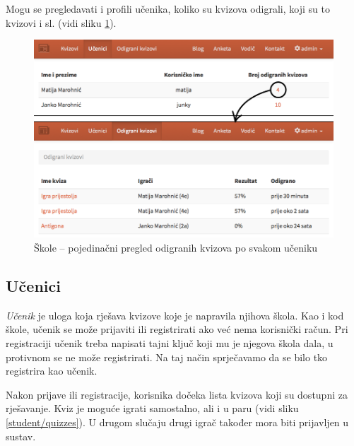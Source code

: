 \documentclass[11pt]{scrreprt}
\begin{document}
Mogu se pregledavati i profili učenika, koliko su kvizova odigrali, koji su to
kvizovi i sl. (vidi sliku \ref{students}).

\begin{figure}[H]
  \includegraphics[width=\textwidth, clip=true, trim=0 0 0 0, fbox]{school/students_details}
  \caption{Škole -- pojedinačni pregled odigranih kvizova po svakom učeniku}
  \label{students}
\end{figure}

\subsection{Učenici}

\emph{Učenik} je uloga koja rješava kvizove koje je napravila njihova škola.
Kao i kod škole, učenik se može prijaviti ili registrirati ako već nema
korisnički račun. Pri registraciji učenik treba napisati tajni ključ koji mu je
njegova škola dala, u protivnom se ne može registrirati. Na taj način
sprječavamo da se bilo tko registrira kao učenik.

Nakon prijave ili registracije, korisnika dočeka lista kvizova koji su dostupni
za rješavanje. Kviz je moguće igrati samostalno, ali i u paru (vidi sliku
\ref{student/quizzes}). U drugom slučaju drugi igrač također mora biti
prijavljen u sustav.
\end{document}
